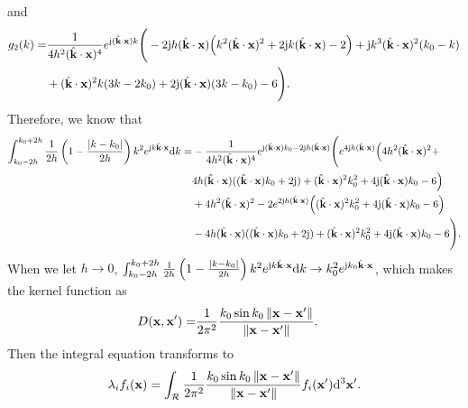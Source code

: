 \documentclass[12pt,draftclsnofoot,journal,onecolumn]{IEEEtran}
\begin{document}
     and
    \begin{equation}
    	\begin{aligned}
    		g_2(k) =& \frac{1}{4 h^2 (\hat{\bf k}\cdot {\bf x})^4}e^{{\rm j} (\hat{\bf k}\cdot {\bf x}) k} \Bigg(-2 {\rm j} h (\hat{\bf k}\cdot {\bf x}) \Big(k^2 (\hat{\bf k}\cdot {\bf x})^2+2 {\rm j} k (\hat{\bf k}\cdot {\bf x})-2\Big)+{\rm j} k^3 (\hat{\bf k}\cdot {\bf x})^2 (k_0-k)\\&+(\hat{\bf k}\cdot {\bf x})^2 k (3 k-2 k_0)+2 {\rm j} (\hat{\bf k}\cdot {\bf x}) (3 k-k_0)-6\Bigg).
    	\end{aligned}
    \end{equation} 
    Therefore, we know that 
    \begin{equation}
    	\begin{aligned}
    		\int_{k_0-2h}^{k_0+2h} \frac{1}{2h}\left( 1-\frac{|k-k_0|}{2h} \right)k^2e^{{\rm j}k\hat{\bf k}\cdot {\bf x}}{\rm d}k
    		=& -\frac{1}{4 h^2 (\hat{\bf k}\cdot {\bf x})^4}e^{{\rm j} (\hat{\bf k}\cdot {\bf x}) k_0-2 {\rm j} h (\hat{\bf k}\cdot {\bf x})} 
    		\Bigg(e^{4 {\rm j} h (\hat{\bf k}\cdot {\bf x})} \Big(4 h^2 (\hat{\bf k}\cdot {\bf x})^2+\\&4 h (\hat{\bf k}\cdot {\bf x}) ((\hat{\bf k}\cdot {\bf x}) k_0+2 {\rm j})+(\hat{\bf k}\cdot {\bf x})^2 k_0^2+4 {\rm j} (\hat{\bf k}\cdot {\bf x}) k_0-6\Big)
    		\\&+4 h^2 (\hat{\bf k}\cdot {\bf x})^2-2 e^{2 {\rm j} h (\hat{\bf k}\cdot {\bf x})} \Big((\hat{\bf k}\cdot {\bf x})^2 k_0^2+4 {\rm j} (\hat{\bf k}\cdot {\bf x}) k_0-6\Big)\\&-4 h (\hat{\bf k}\cdot {\bf x}) ((\hat{\bf k}\cdot {\bf x}) k_0+2 {\rm j})+(\hat{\bf k}\cdot {\bf x})^2 k_0^2+4 {\rm j} (\hat{\bf k}\cdot {\bf x}) k_0-6\Bigg).
    	\end{aligned}
    \end{equation}
    When we let $h\rightarrow 0$, $\int_{k_0-2h}^{k_0+2h} \frac{1}{2h}\left( 1-\frac{|k-k_0|}{2h} \right)k^2e^{{\rm j}k\hat{\bf k}\cdot {\bf x}}{\rm d}k \rightarrow k_0^2 e^{{\rm j}k_0 \hat{\bf k}\cdot {\bf x}}$, which makes the kernel function as 
    \begin{equation}
    	\begin{aligned}
    		D({\bf x},{\bf x}') =&  \frac{1}{2\pi^2} \frac{k_0\sin k_0 \left\| {\bf x}-{\bf x}' \right\|}{\left\|  {\bf x}-{\bf x}' \right\|}.
    	\end{aligned}
    \end{equation}
    Then the integral equation transforms to
    	\begin{equation}
    	\lambda_i f_i({\bf x}) = \int_{\mathcal{R}} \frac{1}{2\pi^2} \frac{k_0\sin k_0 \left\| {\bf x}-{\bf x}' \right\|}{\left\|  {\bf x}-{\bf x}' \right\|}f_i({\bf x}'){\rm d}^3{\bf x}'.
    	\label{equ_sphere_surface}
    \end{equation}
\end{document}
